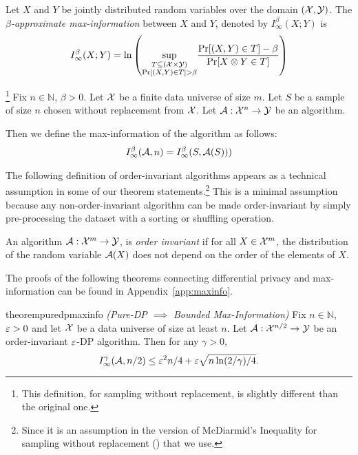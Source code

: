     \begin{definition} Let $X$ and $Y$ be jointly distributed random variables over the domain $(\mathcal{X},\mathcal{Y})$. The \textit{$\beta$-approximate max-information} between $X$ and $Y$, denoted by $I_\infty^\beta(X;Y)$ is
    $$I_\infty^\beta(X;Y) = \ln \left(\underset{\substack{T\subseteq(\mathcal{X}\times\mathcal{Y})\\\Pr[(X,Y)\in T]>\beta}}{\sup}\frac{\Pr[(X,Y)\in T]-\beta}{\Pr[X\otimes Y \in T]}\right)$$
    \end{definition}
    \begin{definition}
    \footnote{This definition, for sampling without replacement, is slightly different than the original one.}  Fix $n \in \mathbb{N}$, $\beta > 0$. Let $\mathcal{X}$ be a finite data universe of size $m$. Let $S$ be a sample of size $n$ chosen without replacement from $\mathcal{X}$. Let $\mathcal{A}: \mathcal{X}^{n} \to \mathcal{Y}$ be an algorithm.

    Then we define the max-information of the algorithm as follows:
    \begin{align}
        I^{\beta}_{\infty}(\mathcal{A}, n) = I^{\beta}_{\infty}(S, \mathcal{A}(S)))
    \end{align}
    \end{definition}

The following definition of order-invariant algorithms appears as a technical assumption in some of our theorem statements.\footnote{Since it is an assumption in the version of McDiarmid's Inequality for sampling without replacement () that we use.} This is a minimal assumption because any non-order-invariant algorithm can be made order-invariant by simply pre-processing the dataset with a sorting or shuffling operation.

\begin{definition}
An algorithm $\mathcal{A}:\mathcal{X}^m \to \mathcal{Y}$, is \emph{order invariant} if for all $X \in \mathcal{X}^m$, the distribution of the random variable $\mathcal{A}(X)$ does not depend on the order of the elements of $X$. 
\end{definition}

The proofs of the following theorems connecting differential privacy and max-information can be found in Appendix~\ref{app:maxinfo}.
\begin{restatable}{theorem}{puredpmaxinfo}\label{thm:pure-dp-implies-maxinfo}
  \emph{(Pure-DP $\implies$ Bounded Max-Information)}  Fix $n \in \mathbb{N}$, $\varepsilon > 0$ and let $\mathcal{X}$ be a data universe of size at least $n$.
  Let $\mathcal{A}:\mathcal{X}^{n/2} \to \mathcal{Y}$ be an order-invariant $\varepsilon$-DP algorithm. Then for any $\gamma > 0$,
    $$I^{\gamma}_{\infty}(\mathcal{A}, n/2) \leq \varepsilon^2n/4 + \varepsilon\sqrt{n\ln(2/\gamma)/4}.$$
\end{restatable}

